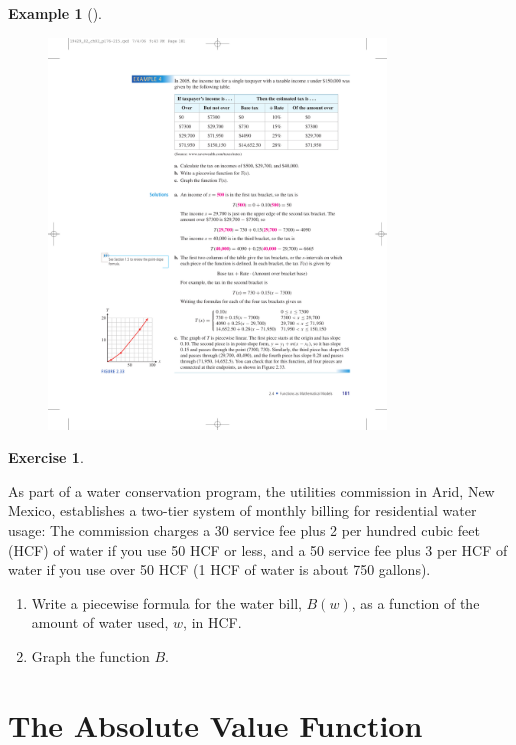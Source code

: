 \documentclass[10pt,]{book}
\theoremstyle{plain}
\theoremstyle{definition}
\theoremstyle{definition}
\theoremstyle{definition}
\newtheorem{example}[theorem]{Example}
\theoremstyle{definition}
\theoremstyle{definition}
\newtheorem{exercise}[theorem]{Exercise}
\numberwithin{equation}{section}
\begin{document}
\begin{example}[]
\begin{enumerate}[label=*\alph**]
\begin{figure}
\includegraphics[width=0.80\textwidth,]{images/fig-income-tax.pdf}\caption{\label{fig-income-tax}}
\end{figure}
\end{enumerate}
\end{example}
\begin{exercise}\label{exercise-water-bill}

    As part of a water conservation program, the utilities commission in Arid, New Mexico, establishes a two-tier system of monthly billing for residential water usage: The commission charges a \textdollar{}30 service fee plus \textdollar{}2 per hundred cubic feet (HCF) of water if you use 50 HCF or less, and a \textdollar{}50 service fee plus \textdollar{}3 per HCF of water if you use over 50 HCF (1 HCF of water is about 750 gallons).
    \leavevmode%
\begin{enumerate}[label=*\alph**]
\item\hypertarget{li-341}{}Write a piecewise formula for the water bill, \(B(w)\), as a function of the amount of water used, \(w\), in HCF.\item\hypertarget{li-342}{}Graph the function \(B\).\end{enumerate}
\end{exercise}
\typeout{************************************************}
\typeout{************************************************}
\section[The Absolute Value Function]{The Absolute Value Function}\label{AbsoluteValue}
\end{document}
